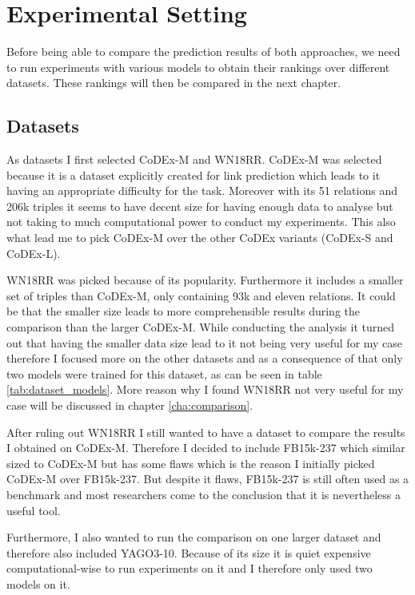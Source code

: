 \chapter{Experimental Setting}
\label{cha:experiment_setting}

Before being able to compare the prediction results of both approaches, we need to run experiments with various models to obtain their rankings over different datasets. These rankings will then be compared in the next chapter.

\section{Datasets}
\label{sec:experiment_datasets}
As datasets I first selected CoDEx-M and WN18RR. CoDEx-M was selected because it is a dataset explicitly created for link prediction which leads to it having an appropriate difficulty for the task. Moreover with its 51 relations and 206k triples it seems to have decent size for having enough data to analyse but not taking to much computational power to conduct my experiments. This also what lead me to pick CoDEx-M over the other CoDEx variants (CoDEx-S and CoDEx-L). \cite{safavi_codex_2020}

WN18RR was picked because of its popularity. Furthermore it includes a smaller set of triples than CoDEx-M, only containing 93k and eleven relations. It could be that the smaller size leads to more comprehensible results during the comparison than the larger CoDEx-M. While conducting the analysis it turned out that having the smaller data size lead to it not being very useful for my case therefore I focused more on the other datasets and as a consequence of that only two models were trained for this dataset, as can be seen in table \ref{tab:dataset_models}. More reason why I found WN18RR not very useful for my case will be discussed in chapter \ref{cha:comparison}.

After ruling out WN18RR I still wanted to have a dataset to compare the results I obtained on CoDEx-M. Therefore I decided to include FB15k-237 which similar sized to CoDEx-M but has some flaws which is the reason I initially picked CoDEx-M over FB15k-237. But despite it flaws, FB15k-237 is still often used as a benchmark and most researchers come to the conclusion that it is nevertheless a useful tool. 

Furthermore, I also wanted to run the comparison on one larger dataset and therefore also included YAGO3-10. Because of its size it is quiet expensive computational-wise to run experiments on it and I therefore only used two models on it.

